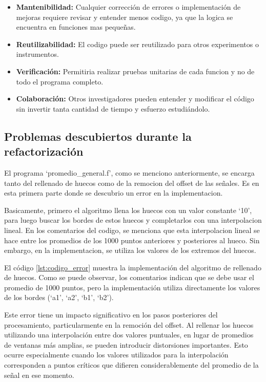 \documentclass[12pt,a4paper]{article}
\begin{document}
\begin{itemize}

\item \textbf{Mantenibilidad:} Cualquier corrección de errores o implementación de mejoras requiere revisar y entender menos codigo, ya que la logica se encuentra en funciones mas pequeñas.

\item \textbf{Reutilizabilidad:} El codigo puede ser reutilizado para otros experimentos o instrumentos.

\item \textbf{Verificación:} Permitiria realizar pruebas unitarias de cada funcion y no de todo el programa completo.

\item \textbf{Colaboración:} Otros investigadores pueden entender y modificar el código sin
invertir tanta cantidad de tiempo y esfuerzo estudiándolo.

\end{itemize}

\subsection{Problemas descubiertos durante la refactorización}

El programa `promedio\_general.f', como se menciono anteriormente, se encarga tanto del rellenado de huecos como de la remocion del offset de las señales. Es en esta primera parte donde se descubrio un error en la implementacion.

Basicamente, primero el algoritmo llena los huecos con un valor constante `10', para luego buscar los bordes de estos huecos y completarlos con una interpolacion lineal. En los comentarios del codigo, se menciona que esta interpolacion lineal se hace entre los promedios de los 1000 puntos anteriores y posteriores al hueco. Sin embargo, en la implementacion, se utiliza los valores de los extremos del huecos.

El código \ref{lst:codigo_error} muestra la implementación del algoritmo de rellenado de huecos. Como se puede observar, los comentarios indican que se debe usar el promedio de 1000 puntos, pero la implementación utiliza directamente los valores de los bordes (`a1', `a2', `b1', `b2').

Este error tiene un impacto significativo en los pasos posteriores del procesamiento, particularmente en la remoción del offset. Al rellenar los huecos utilizando una interpolación entre dos valores puntuales, en lugar de promedios de ventanas más amplias, se pueden introducir distorsiones importantes. Esto ocurre especialmente cuando los valores utilizados para la interpolación corresponden a puntos críticos que difieren considerablemente del promedio de la señal en ese momento.
\end{document}
